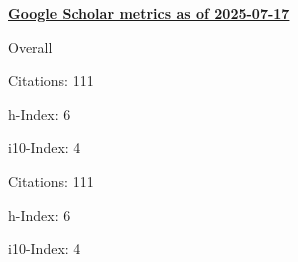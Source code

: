\textbf{\href{https://scholar.google.it/citations?user=iJDPEaUAAAAJ&hl=it&oi=ao}{Google Scholar metrics as of 2025-07-17}}
\medskip
\centering
\begin{minipage}{.4\textwidth}
    \begin{outerlist}
        \item[] Overall
        \begin{innerlist}
            \item Citations: 111
            \item h-Index: 6
            \item i10-Index: 4
        \end{innerlist}
    \end{outerlist}
\end{minipage}
\hfill
\begin{minipage}{.4\textwidth}
    \begin{outerlist}
        \item[] 
        \begin{innerlist}
            \item Citations: 111
            \item h-Index: 6
            \item i10-Index: 4
        \end{innerlist}
    \end{outerlist}
\end{minipage}
\vspace{1em}
